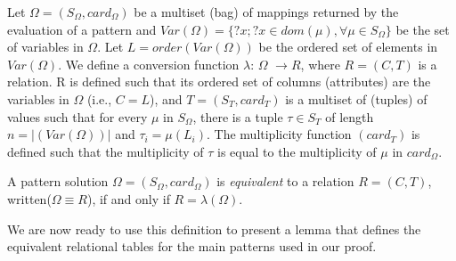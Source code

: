\vspace*{-4pt}
\begin{sloppypar}
\begin{definition}
\label{def:solution2relation}
Let $\Omega = (S_{\Omega}, card_{\Omega})$ be a multiset (bag) of mappings returned by  the evaluation of a \sparql pattern and $Var(\Omega) = \{?x; ?x \in dom(\mu), \forall \mu \in S_{\Omega} \}$ be the set of variables in $\Omega$.
Let ${L} = order(Var(\Omega))$ be the ordered set of elements in $Var(\Omega)$.
We define a conversion function $\lambda$: $\Omega$ $\rightarrow R$, where $R = ({C}, {T})$ is a relation. R is defined such that its ordered set of columns (attributes) are the variables in $\Omega$ (i.e., ${C}=L$), and ${T} = (S_{{T}}, card_{T})$ is a multiset of (tuples) of values such that for every $\mu$ in $S_{\Omega}$, there is a tuple $\tau \in S_{{T}}$ of length $n = |(Var(\Omega))|$ and $\tau_i = \mu(L_i)$. The multiplicity function $(card_{T})$ is defined such that the multiplicity of $\tau$ is equal to the multiplicity of $\mu$ in $card_{\Omega}$.
\end{definition}
\end{sloppypar}

\vspace*{-4pt}
\begin{definition}[Equivalence]
\label{def:equivalence}
A \sparql pattern solution $\Omega = (S_{\Omega}, card_{\Omega})$ is {\em equivalent} to a relation $R = ({C}, {T})$, written($\Omega \equiv R$), if and only if $R=\lambda(\Omega)$.
\end{definition}

\vspace*{-4pt}
We are now ready to use this definition to present a lemma that defines the equivalent relational tables for the  main \sparql patterns used in our proof.

